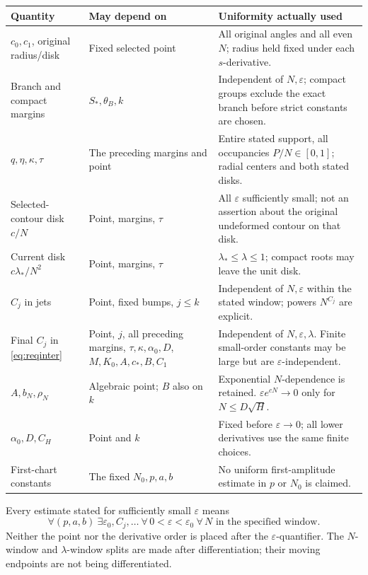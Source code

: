 \documentclass[11pt]{article}
\numberwithin{equation}{section}
\theoremstyle{definition}
\newcommand{\eps}{\varepsilon}
\begin{document}
\begin{longtable}{>{\raggedright\arraybackslash}p{}>{\raggedright\arraybackslash}p{}>{\raggedright\arraybackslash}p{}}
\toprule
Quantity & May depend on & Uniformity actually used\\
\midrule
\endhead
\(c_0,c_1\), original radius/disk &
Fixed selected point & All original angles and all even \(N\);
radius held fixed under each \(s\)-derivative.\\
Branch and compact margins &
\(S_*,\theta_B,k\) & Independent of \(N,\eps\); compact groups
exclude the exact branch before strict constants are chosen.\\
\(q,\eta,\kappa,\tau\) &
The preceding margins and point & Entire stated support, all
occupancies \(P/N\in[0,1]\); radial centers and both stated disks.\\
Selected-contour disk \(c/N\) &
Point, margins, \(\tau\) & All \(\eps\) sufficiently small;
not an assertion about the original undeformed contour on that disk.\\
Current disk \(c\lambda_*/N^2\) &
Point, margins, \(\tau\) & \(\lambda_*\le\lambda\le1\);
compact roots may leave the unit disk.\\
\(C_j\) in jets &
Point, fixed bumps, \(j\le k\) & Independent of \(N,\eps\) within
the stated window; powers \(N^{C_j}\) are explicit.\\
Final \(C_j\) in \eqref{eq:reqinter} &
Point, \(j\), all preceding margins, \(\tau,\kappa,\alpha_0,D\),
\(M,K_0,A,c_*,B,C_1\) & Independent of \(N,\eps,\lambda\).
Finite small-order constants may be large but are
\(\eps\)-independent.\\
\(A,b_N,\rho_N\) &
Algebraic point; \(B\) also on \(k\) & Exponential \(N\)-dependence
is retained. \(\eps e^{cN}\to0\) only for \(N\le D\sqrt H\).\\
\(\alpha_0,D,C_H\) &
Point and \(k\) & Fixed before \(\eps\to0\); all lower derivatives
use the same finite choices.\\
First-chart constants &
The fixed \(N_0,p,a,b\) & No uniform first-amplitude estimate
in \(p\) or \(N_0\) is claimed.\\
\bottomrule
\end{longtable}

Every estimate stated for sufficiently small \(\eps\) means
\[
 \forall(p,a,b)\ \exists\eps_0,C_j,\ldots\
 \forall\,0<\eps<\eps_0\
 \forall\,N\text{ in the specified window}.
\]
Neither the point nor the derivative order is placed after the
\(\eps\)-quantifier. The \(N\)-window and \(\lambda\)-window splits
are made after differentiation; their moving endpoints are not
being differentiated.
\end{document}
